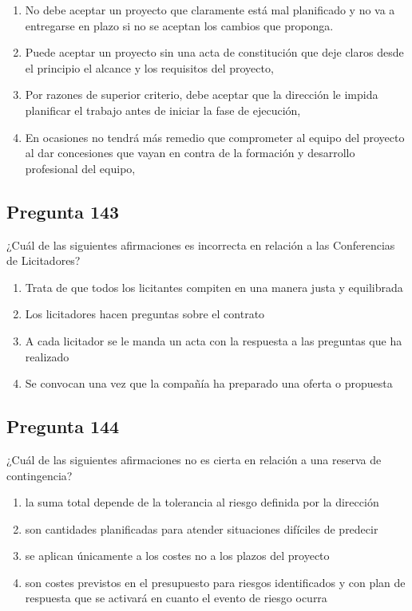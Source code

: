 \documentclass[11pt,a4paper]{article}
\begin{document}
\begin{enumerate}[label=\alph*)]
  \item No debe aceptar un proyecto que claramente está mal planificado y no va a entregarse en plazo si no se aceptan los cambios que proponga.
  \item Puede aceptar un proyecto sin una acta de constitución que deje claros desde el principio el alcance y los requisitos del proyecto,
  \item Por razones de superior criterio, debe aceptar que la dirección le impida planificar el trabajo antes de iniciar la fase de ejecución,
  \item En ocasiones no tendrá más remedio que comprometer al equipo del proyecto al dar concesiones que vayan en contra de la formación y desarrollo profesional del equipo,
\end{enumerate}

\subsection*{Pregunta 143}
¿Cuál de las siguientes afirmaciones es incorrecta en relación a las Conferencias de Licitadores?

\begin{enumerate}[label=\alph*)]
  \item Trata de que todos los licitantes compiten en una manera justa y equilibrada
  \item Los licitadores hacen preguntas sobre el contrato
  \item A cada licitador se le manda un acta con la respuesta a las preguntas que ha realizado
  \item Se convocan una vez que la compañía ha preparado una oferta o propuesta
\end{enumerate}

\subsection*{Pregunta 144}
¿Cuál de las siguientes afirmaciones no es cierta en relación a una reserva de contingencia?

\begin{enumerate}[label=\alph*)]
  \item la suma total depende de la tolerancia al riesgo definida por la dirección
  \item son cantidades planificadas para atender situaciones difíciles de predecir
  \item se aplican únicamente a los costes no a los plazos del proyecto
  \item son costes previstos en el presupuesto para riesgos identificados y con plan de respuesta que se activará en cuanto el evento de riesgo ocurra
\end{enumerate}
\end{document}
